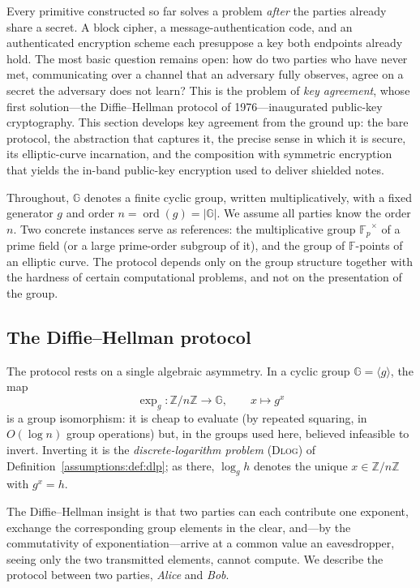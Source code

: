 \documentclass[11pt,a4paper]{article}
\theoremstyle{definition}
\theoremstyle{remark}
\newcommand{\Z}{\ensuremath{\mathbb{Z}}}
\newcommand{\F}{\ensuremath{\mathbb{F}}}
\newcommand{\G}{\ensuremath{\mathbb{G}}}
\newcommand{\Fp}{\ensuremath{\mathbb{F}_{p}}}
\DeclareMathOperator{\ord}{ord}
\begin{document}
Every primitive constructed so far solves a problem \emph{after} the parties already share a secret. A block cipher, a message-authentication code, and an authenticated encryption scheme each presuppose a key both endpoints already hold. The most basic question remains open: how do two parties who have never met, communicating over a channel that an adversary fully observes, agree on a secret the adversary does not learn? This is the problem of \emph{key agreement}, whose first solution---the Diffie--Hellman protocol of 1976---inaugurated public-key cryptography. This section develops key agreement from the ground up: the bare protocol, the abstraction that captures it, the precise sense in which it is secure, its elliptic-curve incarnation, and the composition with symmetric encryption that yields the in-band public-key encryption used to deliver shielded notes.

Throughout, \(\G\) denotes a finite cyclic group, written multiplicatively, with a fixed generator \(g\) and order \(n = \ord(g) = |\G|\). We assume all parties know the order \(n\). Two concrete instances serve as references: the multiplicative group \(\Fp^\times\) of a prime field (or a large prime-order subgroup of it), and the group of \(\F\)-points of an elliptic curve. The protocol depends only on the group structure together with the hardness of certain computational problems, and not on the presentation of the group.

\subsection{The Diffie--Hellman protocol}\label{keyagreement:subsec:dh}

The protocol rests on a single algebraic asymmetry. In a cyclic group \(\G = \langle g\rangle\), the map
\[
  \exp_g \colon \Z/n\Z \to \G, \qquad x \mapsto g^x
\]
is a group isomorphism: it is cheap to evaluate (by repeated squaring, in \(O(\log n)\) group operations) but, in the groups used here, believed infeasible to invert. Inverting it is the \emph{discrete-logarithm problem} (\textsc{Dlog}) of Definition~\ref{assumptions:def:dlp}; as there, \(\log_g h\) denotes the unique \(x \in \Z/n\Z\) with \(g^x = h\).

The Diffie--Hellman insight is that two parties can each contribute one exponent, exchange the corresponding group elements in the clear, and---by the commutativity of exponentiation---arrive at a common value an eavesdropper, seeing only the two transmitted elements, cannot compute. We describe the protocol between two parties, \emph{Alice} and \emph{Bob}.
\end{document}
